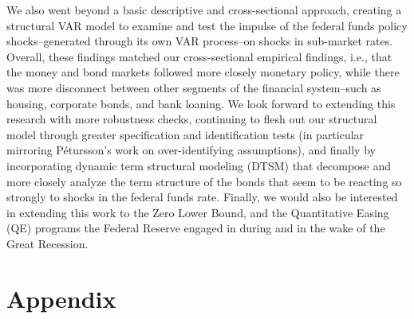 \documentclass[12pt,final]{article}
\def\bibfname{paper_bib.bib}
\begin{document}
We also went beyond a basic descriptive and cross-sectional approach, creating a structural VAR model to examine and test the impulse of the federal funds policy shocks--generated through its own VAR process--on shocks in sub-market rates. Overall, these findings matched our cross-sectional empirical findings, i.e., that the money and bond markets followed more closely monetary policy, while there was more disconnect between other segments of the financial system--such as housing, corporate bonds, and bank loaning. We look forward to extending this research with more robustness checks, continuing to flesh out our structural model through greater specification and identification tests (in particular mirroring Pétursson's work on over-identifying assumptions), and finally by incorporating dynamic term structural modeling (DTSM) that decompose and more closely analyze the term structure of the bonds that seem to be reacting so strongly to shocks in the federal funds rate. Finally, we would also be interested in extending this work to the Zero Lower Bound, and the Quantitative Easing (QE) programs the Federal Reserve engaged in during and in the wake of the Great Recession.

\clearpage



\clearpage
\section{Appendix}
\end{document}
